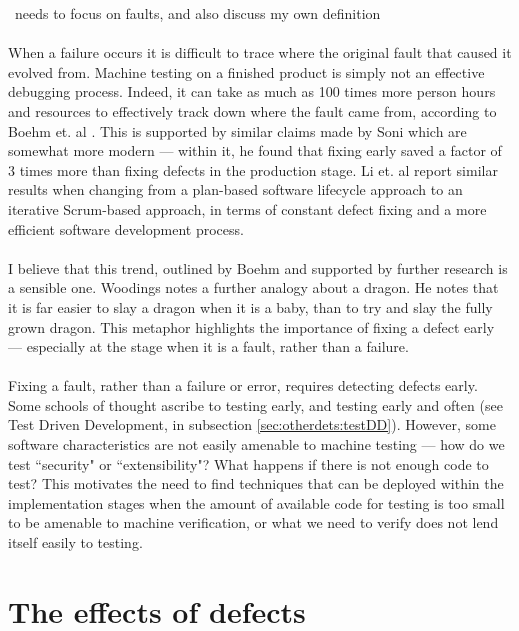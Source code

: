 \FIXME\ needs to focus on faults, and also discuss my own definition\\
\\
When a failure occurs it is difficult to trace where the original fault that caused it evolved from.
Machine testing on a finished product is simply not an effective debugging process.
Indeed, it can take as much as 100 times more person hours and resources to effectively track down
where the fault came from, according to Boehm et. al \cite{boehm2005foundations}.
This is supported by similar claims made by Soni \cite{soni2006defect} which are somewhat more
modern --- within it, he found that fixing early saved a factor of 3 times more than fixing defects
in the production stage.
Li et. al \cite{li2010transition} report similar results when changing from a plan-based software
lifecycle approach to an iterative Scrum-based approach, in terms of constant defect fixing and a
more efficient software development process.\\
\\
I believe that this trend, outlined by Boehm and supported by further research is a sensible one.
Woodings \cite{terryLecture4220} notes a further analogy about a dragon.
He notes that it is far easier to slay a dragon when it is a baby, than to try and slay the fully
grown dragon.
This metaphor highlights the importance of fixing a defect early --- especially at the stage when it
is a fault, rather than a failure.\\
\\
Fixing a fault, rather than a failure or error, requires detecting defects early.
Some schools of thought ascribe to testing early, and testing early and often (see Test Driven Development, in
subsection \ref{sec:otherdets:testDD}).
However, some software characteristics are not easily amenable to machine testing --- how do we test
``security" or ``extensibility"?
What happens if there is not enough code to test?
This motivates the need to find techniques that can be deployed within the implementation stages
when the amount of available code for testing is too small to be amenable to machine verification,
or what we need to verify does not lend itself easily to testing.

\section{The effects of defects} \label{sec:defects:defEffects}


